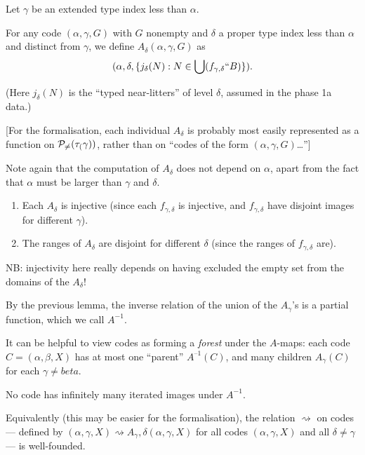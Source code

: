 \begin{definition}
\label {def:a-map}
Let $\gamma$ be an extended type index less than $\alpha$.

For any code $(\alpha,\gamma,G)$ with $G$ nonempty and $\delta$ a proper type index less than $\alpha$ and distinct from $\gamma$, we define
$A_\delta(\alpha,\gamma,G)$ as $$(\alpha,\delta,\{ j_\delta(N) : N \in \bigcup (f_{\gamma,\delta}``B)\}).$$

(Here $j_\delta(N)$ is the “typed near-litters” of level $\delta$, assumed in the phase 1a data.)

[For the formalisation, each individual $A_\delta$ is probably most easily represented as a function on $\mathcal{P}_{\neq \empty}(\tau_(\gamma))$, rather than on “codes of the form $(\alpha,\gamma,G)$…”]
\end{definition}

Note again that the computation of $A_\delta$ does not depend on $\alpha$, apart from the fact that $\alpha$ must be larger than $\gamma$ and $\delta$.

\begin{lemma}
\label {lem:a-map-properties}
\begin{enumerate}
\item Each $A_\delta$ is injective (since each $f_{\gamma,\delta}$ is injective, and $f_{\gamma,\delta}$ have disjoint images for different $\gamma$).
\item The ranges of $A_\delta$ are disjoint for different $\delta$ (since the ranges of $f_{\gamma,\delta}$ are).
\end{enumerate}

NB: injectivity here really depends on having excluded the empty set from the domains of the $A_\delta$!
\end{lemma}

\begin{definition}
\label {def:ainverse}
By the previous lemma, the inverse relation of the union of the $A_\gamma$'s is a partial function, which we call $A^{-1}$.

It can be helpful to view codes as forming a \emph{forest} under the $A$-maps: each code $C = (\alpha,\beta,X)$ has at most one “parent” $A^{–1}(C)$, and many children $A_\gamma(C)$ for each $\gamma \neq beta$.
\end{definition}

\begin{lemma}
\label{lem:ainverse-stops}
No code has infinitely many iterated images under $A^{-1}$.

Equivalently (this may be easier for the formalisation), the relation $\rightsquigarrow$ on codes --- defined by $ (\alpha,\gamma ,X) \rightsquigarrow A_\gamma,\delta (\alpha,\gamma ,X)$ for all codes $ (\alpha,\gamma ,X)$ and all $\delta \neq \gamma$ --- is well-founded.
\end{lemma}

